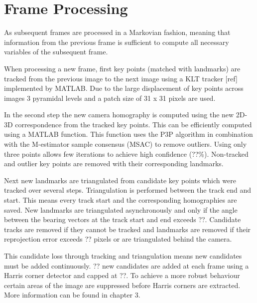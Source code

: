 \section{Frame Processing}
As subsequent frames are processed in a Markovian fashion, meaning that information from the previous frame is sufficient to compute all necessary variables of the subsequent frame. \par
When processing a new frame, first key points (matched with landmarks) are tracked from the previous image to the next image using a KLT tracker [ref] implemented by MATLAB. Due to the large displacement of key points across images 3 pyramidal levels and a patch size of 31 x 31 pixels are used. \par
In the second step the new camera homography is computed using the new 2D-3D correspondence from the tracked key points. This can be efficiently computed using a MATLAB function. This function uses the P3P algorithm in combination with the M-estimator sample consensus (MSAC) to remove outliers. Using only three points allows few iterations to achieve high confidence (??\%). Non-tracked and outlier key points are removed with their corresponding landmarks.\par
Next new landmarks are triangulated from candidate key points which were tracked over several steps. Triangulation is performed between the track end and start. This means every track start and the corresponding homographies are saved. New landmarks are triangulated asynchronously and only if the angle between the bearing vectors at the track start and end exceeds ??. Candidate tracks are removed if they cannot be tracked and landmarks are removed if their reprojection error exceeds ?? pixels or are triangulated behind the camera.\par
This candidate loss through tracking and triangulation means new candidates must be added continuously. ?? new candidates are added at each frame using a Harris corner detector and capped at ??. To achieve a more robust behaviour certain areas of the image are suppressed before Harris corners are extracted. More information can be found in chapter 3.  
